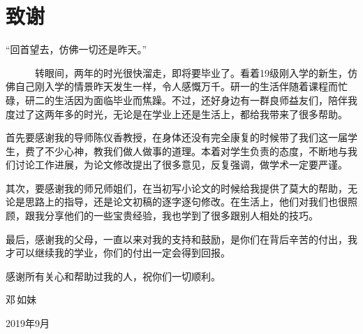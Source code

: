 {\kaishu
{\chapter*{\vspace{-3cm} 致\qquad 谢}}

\vspace{-0.5cm}

\begin{center} 
“回首望去，仿佛一切还是昨天。”
\end{center}
~~~~~~转眼间，两年的时光很快溜走，即将要毕业了。看着19级刚入学的新生，仿佛自己刚入学的情景昨天发生一样，令人感慨万千。研一的生活伴随着课程而忙碌，研二的生活因为面临毕业而焦躁。不过，还好身边有一群良师益友们，陪伴我度过了这两年多的时光，无论是在学业上还是生活上，都给我带来了很多帮助。

首先要感谢我的导师陈仪香教授，在身体还没有完全康复的时候带了我们这一届学生，费了不少心神，教我们做人做事的道理。本着对学生负责的态度，不断地与我们讨论工作进展，为论文修改提出了很多意见，反复强调，做学术一定要严谨。

其次，要感谢我的师兄师姐们，在当初写小论文的时候给我提供了莫大的帮助，无论是思路上的指导，还是论文初稿的逐字逐句修改。在生活上，他们对我们也很照顾，跟我分享他们的一些宝贵经验，我也学到了很多跟别人相处的技巧。

最后，感谢我的父母，一直以来对我的支持和鼓励，是你们在背后辛苦的付出，我才可以继续我的学业，你们的付出一定会得到回报。

感谢所有关心和帮助过我的人，祝你们一切顺利。


\vspace{0.2cm} \hspace{11.5cm}  邓\,如妹

\hspace{10.6cm}  2019年9月 }
